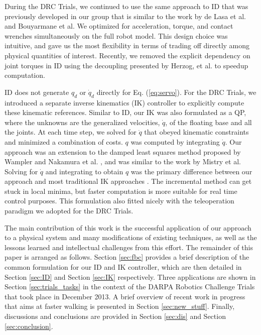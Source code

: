 \documentclass{ws-ijhr}
\newcommand{\eref}[1] {Eq. (\ref{#1})}
\newcommand{\sref}[1] {Section \ref{#1}}
\begin{document}
During the DRC Trials, we continued to use the same approach to ID that was 
previously developed in our group \cite{stephens_thesis,whitman_thesis,sfeng_online} 
that is similar to the work by de Lasa et al. \cite{deLasa_hir} and 
Bouyarmane et al. \cite{bouyarmane_vrc} 
We optimized for acceleration, torque, and contact wrenches simultaneously 
on the full robot model. This design choice was intuitive, and gave us the
most flexibility in terms of trading off directly among physical quantities
of interest. Recently, we removed the explicit dependency on joint torques in
ID using the decoupling presented by Herzog, et al. \cite{alex_hir} to speedup
computation.

ID does not generate $q_d$ or $\dot{q}_d$ directly for \eref{eq:servo}.
For the DRC Trials, we introduced a separate inverse kinematics (IK) controller to
explicitly compute these kinematic references. 
Similar to ID, our IK was also formulated as a QP, where the unknowns are the 
generalized velocities, $\dot{q}$, of the floating base and all the joints. 
At each time step, we solved for $\dot{q}$ that obeyed kinematic constraints 
and minimized a combination of costs. $q$ was computed by integrating $\dot{q}$. 
Our approach was an extension to the damped least squares method proposed by 
Wampler and Nakamura et al. \cite{wampler_damped_ik,nakamura_ik}, and was 
similar to the work by Mistry et al.\cite{mistry_ik} 
Solving for $\dot{q}$ and integrating to obtain $q$ was the primary difference
between our approach and most traditional IK approaches 
\cite{kajita03,asimo,hrp2}. 
The incremental method can get stuck in local minima, but faster computation
is more suitable for real time control purposes. 
This formulation also fitted nicely with the teleoperation paradigm we 
adopted for the DRC Trials. 

The main contribution of this work is the successful application of our approach 
to a physical system and many modifications of existing techniques, 
as well as the lessons learned and intellectual challenges from this effort. 
The remainder of this paper is arranged as follows. 
\sref{sec:fbc} provides a brief description of the common formulation for 
our ID and IK controller, which are then detailed in \sref{sec:ID} and \sref{sec:IK}
respectively.
Three applications are shown in \sref{sec:trials_tasks} 
in the context of the DARPA Robotics Challenge Trials that took place in 
December 2013. 
A brief overview of recent work in progress that aims at faster walking 
is presented in \sref{sec:new_stuff}.
Finally, discussions and conclusions are provided 
in \sref{sec:dis} and \sref{sec:conclusion}.
\end{document}
